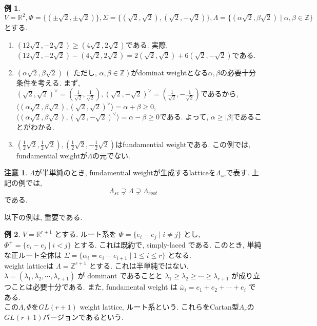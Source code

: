 \documentclass[
  a4paper, 
  12pt,
  ja=standard,
  xelatex,
  left=30truemm,
  right=30truemm,
  titlepage 
]{bxjsarticle}
\theoremstyle{definition}
\newtheorem*{ex}{例}
\newtheorem*{re}{注意}
\begin{document}
\begin{ex}
  $V = \mathbb{R}^2, \Phi = \{ (\pm \sqrt{2}, \pm \sqrt{2})\}, \Sigma = \{ ( \sqrt{2}, \sqrt{2}), ( \sqrt{2}, - \sqrt{2})\}, \Lambda = \{  (\alpha \sqrt{2}, \beta \sqrt{2}) \mid \alpha, \beta \in \mathbb{Z} \}$とする.
  \begin{enumerate}
    \item $(12 \sqrt{2}, -2 \sqrt{2}) \geq (4 \sqrt{2}, 2 \sqrt{2})$である. 実際, $(12 \sqrt{2}, -2 \sqrt{2}) - (4 \sqrt{2}, 2 \sqrt{2}) = 2 ( \sqrt{2}, \sqrt{2}) + 6 ( \sqrt{2}, - \sqrt{2})$である.
    \item $(\alpha \sqrt{2}, \beta \sqrt{2}) \ ( \text{ ただし, }\alpha, \beta \in \mathbb{Z} )$がdominat weightとなる$\alpha, \beta$の必要十分条件を考える.
    まず, $( \sqrt{2}, \sqrt{2})^{ \vee } = ( \frac{1}{\sqrt{2}}, \frac{1}{\sqrt{2}}), ( \sqrt{2}, - \sqrt{2})^{ \vee } = ( \frac{1}{\sqrt{2}}, - \frac{1}{\sqrt{2}})$であるから,
    $\langle (\alpha \sqrt{2}, \beta \sqrt{2}) ,( \sqrt{2}, \sqrt{2})^{ \vee } \rangle = \alpha + \beta \geq 0$, $\langle (\alpha \sqrt{2}, \beta \sqrt{2}) ,( \sqrt{2}, - \sqrt{2})^{ \vee } \rangle = \alpha - \beta \geq 0$である.
    よって, $\alpha \geq | \beta | $であることがわかる.
    \item $(\frac{1}{2}\sqrt{2}, \frac{1}{2}\sqrt{2}), (\frac{1}{2}\sqrt{2}, - \frac{1}{2}\sqrt{2})$はfundamential weightである.
    この例では, fundamential weightが$\Lambda$の元でない.
  \end{enumerate} 
\end{ex}

\begin{re}
  $\Lambda$が半単純のとき, fundamential weightが生成するlatticeを$\Lambda_{sc}$で表す. 上記の例では,
  $$ \Lambda_{sc} \supsetneq \Lambda \supsetneq \Lambda_{root}$$
  である.
\end{re}


以下の例は, 重要である.

\begin{ex}
  $V = \mathbb{R}^{r+1}$ とする. ルート系を $\Phi = \{ e_i - e_j \mid i \neq j \}$ とし, $\Phi^{+} = \{ e_i - e_j \mid i < j \}$ とする.
  これは既約で, simply-laced である. このとき, 単純な正ルート全体は $\Sigma = \{ \alpha_i = e_i - e_{i+1} \mid 1 \leq i \leq r \}$ となる. \\
  weight latticeは $\Lambda = \mathbb{Z}^{r+1}$ とする. これは半単純ではない. \\
  $\lambda = (\lambda_1, \lambda_2, \cdots, \lambda_{r+1})$ が dominant であることと $\lambda_1 \geq \lambda_2 \geq \cdots \geq \lambda_{r+1}$
  が成り立つことは必要十分である. また, fundamental weight は $\bar{\omega}_i = e_1 + e_2 + \cdots + e_i$ である. \\
  この$\Lambda, \Phi$を$GL(r+1)$ weight lattice, ルート系という. これらをCartan型$A_r$の$GL(r+1)$バージョンであるという.
\end{ex}
\end{document}
